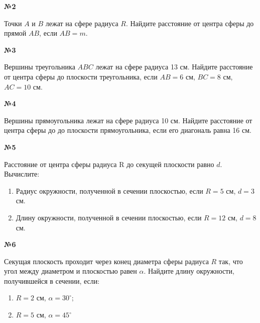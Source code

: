      \begin{center}
        \textbf{№2}
    \end{center}

    Точки $A$ и $B$ лежат на сфере радиуса $R$.
    Найдите расстояние от центра сферы до прямой $AB$, если $AB = m$.

    \begin{center}
        \textbf{№3}
    \end{center}

    Вершины треугольника $ABC$ лежат на сфере радиуса 13 см.
    Найдите расстояние от центра сферы до плоскости треугольника, если $AB = 6$ см, $BC = 8$ см, $AC = 10$ см.

    \begin{center}
        \textbf{№4}
    \end{center}

    Вершины прямоугольника лежат на сфере радиуса 10 см.
    Найдите расстояние от центра сферы до до плоскости прямоугольника, если его диагональ равна 16 см.

    \begin{center}
        \textbf{№5}
    \end{center}

    Расстояние от центра сферы радиуса R до секущей плоскости равно $d$.
    Вычислите:
    \begin{enumerate}
        \item Радиус окружности, полученной в сечении плоскостью, если $R = 5$ см, $d = 3$ см.
        \item Длину окружности, полученной в сечении плоскостью, если $R = 12$ см, $d = 8$ см.
    \end{enumerate}

    \begin{center}
        \textbf{№6}
    \end{center}

    Секущая плоскость проходит через конец диаметра сферы радиуса $R$ так,
    что угол между диаметром и плоскостью равен $\alpha$.
    Найдите длину окружности, получившейся в сечении, если:
    \begin{enumerate}
        \item $R = 2$ см, $\alpha = 30 ^{\circ}$;
        \item $R = 5$ см, $\alpha = 45 ^{\circ}$
    \end{enumerate}



